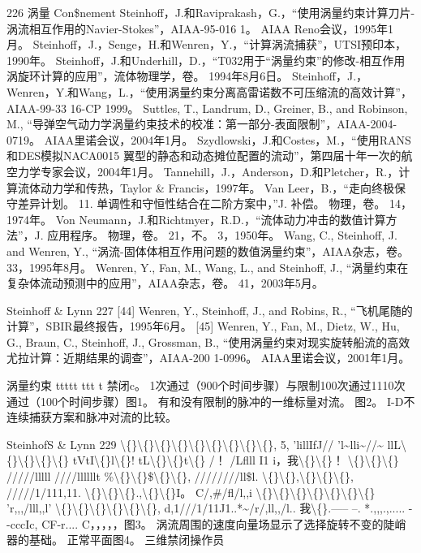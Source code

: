\documentclass[UTF8,11pt,a4paper,openany,fontset=fandol]{ctexbook}
\begin{document}
226 涡量 Con\$nement Steinhoff，J.和Raviprakash，G.，“使用涡量约束计算刀片-涡流相互作用的Navier-Stokes”，AIAA-95-016 1。 AIAA Reno会议，1995年1月。 Steinhoff，J.，Senge，H.和Wenren，Y.，“计算涡流捕获”，UTSI预印本，1990年。 Steinhoff，J.和Underhill，D.，“T032用于“涡量约束”的修改-相互作用涡旋环计算的应用”，流体物理学，卷。 1994年8月6日。 Steinhoff，J.，Wenren，Y.和Wang，L.，“使用涡量约束分离高雷诺数不可压缩流的高效计算”，AIAA-99-33 16-CP 1999。 Suttles, T., Landrum, D., Greiner, B., and Robinson, M., “导弹空气动力学涡量约束技术的校准：第一部分-表面限制”，AIAA-2004-0719。 AIAA里诺会议，2004年1月。 Szydlowski，J.和Costes，M.，“使用RANS和DES模拟NACA0015 翼型的静态和动态摊位配置的流动”，第四届十年一次的航空力学专家会议，2004年1月。 Tannehill，J.，Anderson，D.和Pletcher，R.，计算流体动力学和传热，Taylor \& Francis，1997年。 Van Leer，B.，“走向终极保守差异计划。 11. 单调性和守恒性结合在二阶方案中，”J. 补偿。 物理，卷。 14，1974年。 Von Neumann，J.和Richtmyer，R.D.，“流体动力冲击的数值计算方法”，J. 应用程序。 物理，卷。 21，不。 3，1950年。 Wang, C., Steinhoff, J. and Wenren, Y., “涡流-固体体相互作用问题的数值涡量约束”，AIAA杂志，卷。 33，1995年8月。 Wenren, Y., Fan, M., Wang, L., and Steinhoff, J., “涡量约束在复杂体流动预测中的应用”，AIAA杂志，卷。 41，2003年5月。

Steinhoff \& Lynn 227 [44] Wenren, Y., Steinhoff, J., and Robins, R., “飞机尾随的计算”，SBIR最终报告，1995年6月。 [45] Wenren, Y., Fan, M., Dietz, W., Hu, G., Braun, C., Steinhoff, J., Grossman, B., “使用涡量约束对现实旋转船流的高效尤拉计算：近期结果的调查”，AIAA-200 1-0996。 AIAA里诺会议，2001年1月。

涡量约束 ttttt ttt t 禁闭c。 1次通过（900个时间步骤）与限制100次通过1110次通过（100个时间步骤）图1。 有和没有限制的脉冲的一维标量对流。 图2。 I-D不连续捕获方案和脉冲对流的比较。

SteinhofS \& Lynn 229 \textbackslash\{\}\textbackslash\{\}\textbackslash\{\}\textbackslash\{\}\textbackslash\{\}\textbackslash\{\}\textbackslash\{\}\textbackslash\{\}\textbackslash\{\}, 5, 'lillIfJ// 'l\textasciitilde{}lli\textasciitilde{}//\textasciitilde{} llL\textbackslash\{\}\textbackslash\{\}\textbackslash\{\}\textbackslash\{\} tVtI\textbackslash\{\}l\textbackslash\{\}! tL\textbackslash\{\}\textbackslash\{\}t\textbackslash\{\} /！ /Lflll I1 i，我\textbackslash\{\}\textbackslash\{\}！ \textbackslash\{\}\textbackslash\{\}\textbackslash\{\} /////lllll ////llllllt \%\textbackslash\{\}\textbackslash\{\}\$\textbackslash\{\}\textbackslash\{\}, ////////ll\$l. \textbackslash\{\}\textbackslash\{\},\textbackslash\{\}\textbackslash\{\}\textbackslash\{\}, /////1/111,11. \textbackslash\{\}\textbackslash\{\}\textbackslash\{\}.,\textbackslash\{\}\textbackslash\{\}I。 C/,\#/fl/l,,i \textbackslash\{\}\textbackslash\{\}\textbackslash\{\}\textbackslash\{\}\textbackslash\{\}\textbackslash\{\}\textbackslash\{\} 'r,,,/lll,,l' \textbackslash\{\}\textbackslash\{\}\textbackslash\{\}\textbackslash\{\}\textbackslash\{\}\textbackslash\{\}, d,1///1/11J1..*\textasciitilde{}/r/,ll,,/l.. 我\textbackslash\{\}.----- --. *.,,,.,..... - -cccIc, CF-r.... C，，，，，图3。 涡流周围的速度向量场显示了选择旋转不变的陡峭器的基础。 正常平面图4。 三维禁闭操作员
\end{document}
